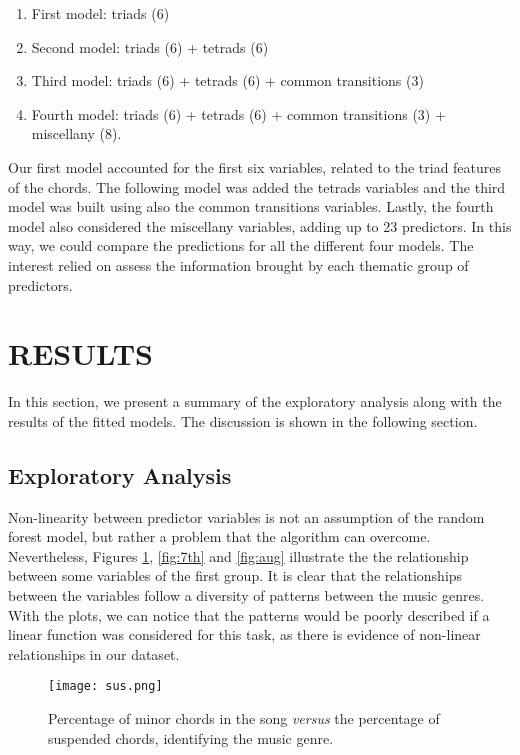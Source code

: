 \documentclass[twocolumn]{article}
\begin{document}
\begin{enumerate}
    \item First model: triads (6)
    \item Second model: triads (6) + tetrads (6)
    \item Third model: triads (6) + tetrads (6) + common transitions (3)
    \item Fourth model: triads (6) + tetrads (6) +
        common transitions (3) + miscellany (8).
\end{enumerate}

Our first model accounted for the first
six variables, related to the triad features of the chords. The following model was
added the tetrads variables and the third model
was built using also the common
transitions variables. Lastly, the fourth
model also considered the miscellany variables, 
adding up to 23 predictors. In this way, we could  
compare the predictions for all the different four models. 
The interest relied on assess the information brought 
by each thematic group of predictors. 

\section{RESULTS}

In this section, we present a summary
of the exploratory analysis along with
the results of the fitted models. The discussion
is shown in the following section.

\subsection{Exploratory Analysis}

Non-linearity between predictor variables
is not an assumption of the random
forest model, but rather a problem that
the algorithm can overcome. Nevertheless,
Figures \ref{fig:sus}, \ref{fig:7th}
and \ref{fig:aug} illustrate the 
the relationship between some variables of
the first group. It is clear that
the relationships between the variables
follow a diversity of patterns between
the music genres. With the plots,
we can notice that the patterns 
would be poorly described if a linear
function was considered for this task,
as there is evidence of
non-linear relationships in our dataset.

\begin{figure}[t]
\centering
\texttt{[image: sus.png]}
\caption{Percentage of minor chords 
in the song \textit{versus} the percentage
of suspended chords, identifying the music
genre.}
\label{fig:sus}
\end{figure}
\end{document}

